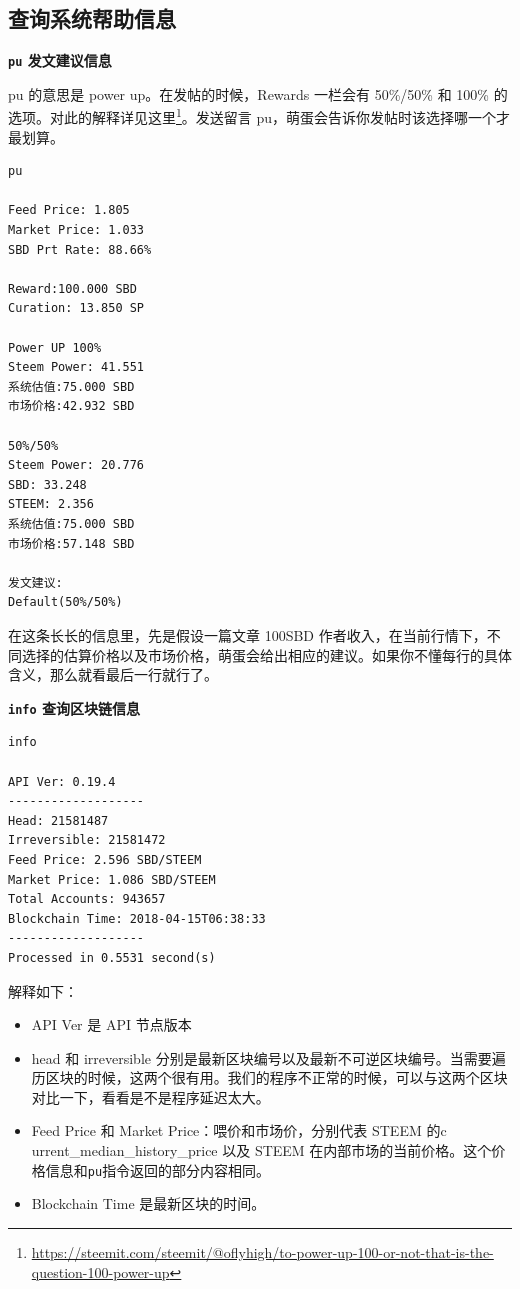 \documentclass[]{ctexbook}
\renewcommand{\href}[2]{#2\footnote{\url{#1}}}
\begin{document}
\subsection{查询系统帮助信息}

\textbf{\texttt{pu} 发文建议信息}

pu 的意思是 power up。在发帖的时候，Rewards 一栏会有 50\%/50\% 和 100\% 的选项。对此的解释详见\href{https://steemit.com/steemit/@oflyhigh/to-power-up-100-or-not-that-is-the-question-100-power-up}{这里}。发送留言 pu，萌蛋会告诉你发帖时该选择哪一个才最划算。

\begin{verbatim}
pu

Feed Price: 1.805
Market Price: 1.033
SBD Prt Rate: 88.66%

Reward:100.000 SBD
Curation: 13.850 SP

Power UP 100%
Steem Power: 41.551
系统估值:75.000 SBD
市场价格:42.932 SBD

50%/50%
Steem Power: 20.776
SBD: 33.248
STEEM: 2.356
系统估值:75.000 SBD
市场价格:57.148 SBD

发文建议: 
Default(50%/50%)
\end{verbatim}

在这条长长的信息里，先是假设一篇文章 100SBD 作者收入，在当前行情下，不同选择的估算价格以及市场价格，萌蛋会给出相应的建议。如果你不懂每行的具体含义，那么就看最后一行就行了。

\textbf{\texttt{info} 查询区块链信息}

\begin{verbatim}
info

API Ver: 0.19.4
-------------------
Head: 21581487
Irreversible: 21581472
Feed Price: 2.596 SBD/STEEM
Market Price: 1.086 SBD/STEEM
Total Accounts: 943657
Blockchain Time: 2018-04-15T06:38:33
-------------------
Processed in 0.5531 second(s)
\end{verbatim}

解释如下：

\begin{itemize}
\item
  API Ver 是 API 节点版本
\item
  head 和 irreversible 分别是最新区块编号以及最新不可逆区块编号。当需要遍历区块的时候，这两个很有用。我们的程序不正常的时候，可以与这两个区块对比一下，看看是不是程序延迟太大。
\item
  Feed Price 和 Market Price：喂价和市场价，分别代表 STEEM 的c urrent\_median\_history\_price 以及 STEEM 在内部市场的当前价格。这个价格信息和\texttt{pu}指令返回的部分内容相同。
\item
  Blockchain Time 是最新区块的时间。
\end{itemize}
\end{document}
